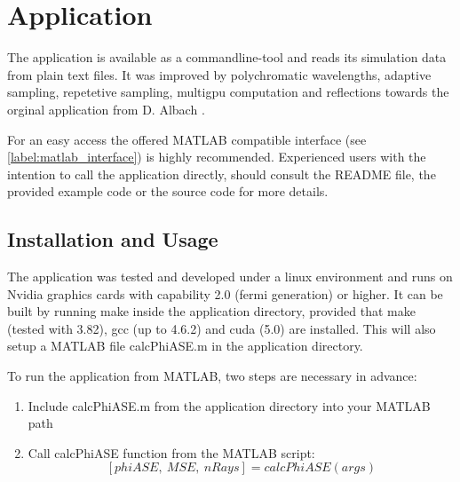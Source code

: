 \section{Application}
\label{sec:application}

The application is available as a commandline-tool and reads
its simulation data from plain text files. It was improved by polychromatic
wavelengths, adaptive sampling, repetetive sampling, multigpu computation and 
reflections towards the orginal application from D. Albach \cite{ASE2010}.

For an easy access the offered MATLAB compatible interface (see \ref{label:matlab_interface}) 
is highly recommended. Experienced users with the intention to call the application
directly, should consult the README file, the provided 
example code or the source code for more details.

\subsection{Installation and Usage}
The application was tested and developed under a linux environment
and runs on Nvidia graphics cards with capability 2.0 (fermi generation) or higher.
It can be built by running make inside the application directory, provided
that make (tested with 3.82), gcc (up to 4.6.2) and cuda (5.0) are installed. 
This will also setup a MATLAB file calcPhiASE.m in the application
directory. 

To run the application from MATLAB, two steps are
necessary in advance:
\begin{enumerate}
  \label{label:matlab_interface}
  \item Include calcPhiASE.m from the application directory into your MATLAB path
  \item Call calcPhiASE function from the MATLAB script: \[[phiASE,~MSE,~nRays] = calcPhiASE(args)\]
\end{enumerate}

